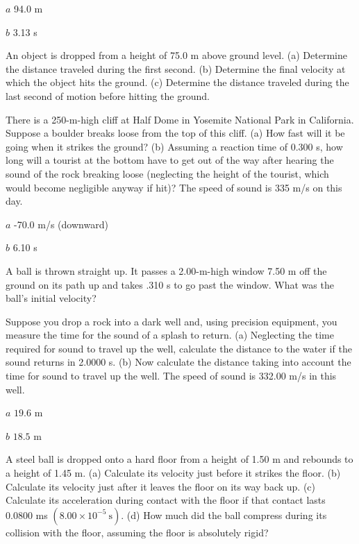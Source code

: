 \documentclass[
]{book}
\newenvironment{problems-exercises}{}{}
\begin{document}
\begin{problems-exercises}
\leavevmode\hypertarget{fs-id4065048}{}%
\(a\) 94.0 m

\(b\) 3.13 s

\hypertarget{fs-id776278}{}
\leavevmode\hypertarget{fs-id3510883}{}%
An object is dropped from a height of 75.0 m above ground level. (a)
Determine the distance traveled during the first second. (b) Determine
the final velocity at which the object hits the ground. (c) Determine
the distance traveled during the last second of motion before hitting
the ground.

\hypertarget{fs-id1798285}{}
\leavevmode\hypertarget{fs-id1757237}{}%
There is a 250-m-high cliff at Half Dome in Yosemite National Park in
California. Suppose a boulder breaks loose from the top of this cliff.
(a) How fast will it be going when it strikes the ground? (b) Assuming a
reaction time of 0.300 s, how long will a tourist at the bottom have to
get out of the way after hearing the sound of the rock breaking loose
(neglecting the height of the tourist, which would become negligible
anyway if hit)? The speed of sound is 335 m/s on this day.

\leavevmode\hypertarget{fs-id1465838}{}%
\(a\) -70.0 m/s (downward)

\(b\) 6.10 s

\hypertarget{fs-id4044798}{}
\leavevmode\hypertarget{fs-id1758045}{}%
A ball is thrown straight up. It passes a 2.00-m-high window 7.50 m off
the ground on its path up and takes .310 s to go past the window. What
was the ball's initial velocity?

\hypertarget{fs-id4048528}{}
\leavevmode\hypertarget{fs-id4122121}{}%
Suppose you drop a rock into a dark well and, using precision equipment,
you measure the time for the sound of a splash to return. (a) Neglecting
the time required for sound to travel up the well, calculate the
distance to the water if the sound returns in 2.0000 s. (b) Now
calculate the distance taking into account the time for sound to travel
up the well. The speed of sound is 332.00 m/s in this well.

\leavevmode\hypertarget{fs-id1772027}{}%
\(a\) \({\text{19}\text{.}\text{6\ m}}{}\)

\(b\) \({\text{18}\text{.}\text{5\ m}}{}\)

\hypertarget{fs-id2561073}{}
\leavevmode\hypertarget{fs-id4020060}{}%
A steel ball is dropped onto a hard floor from a height of 1.50 m and
rebounds to a height of 1.45 m. (a) Calculate its velocity just before
it strikes the floor. (b) Calculate its velocity just after it leaves
the floor on its way back up. (c) Calculate its acceleration during
contact with the floor if that contact lasts 0.0800 ms
\({(8\text{.}{\text{00} \times \text{10}^{- 5}}\ \text{s})}{}\). (d) How
much did the ball compress during its collision with the floor, assuming
the floor is absolutely rigid?


\end{problems-exercises}
\end{document}

